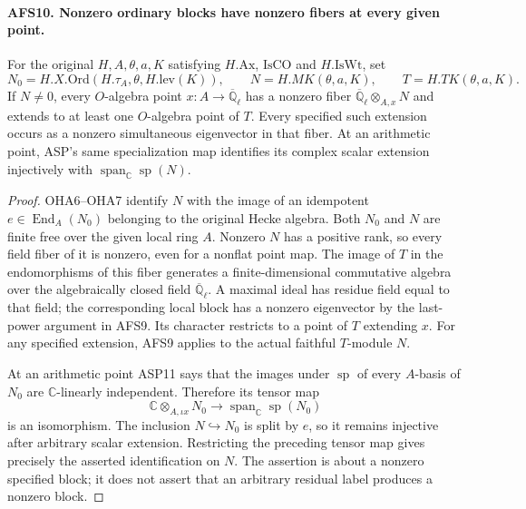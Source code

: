 \paragraph{AFS10. Nonzero ordinary blocks have nonzero fibers at every given point.}
\label{claim:AFS10}
For the original $H,A,\theta,a,K$ satisfying $H.\mathrm{Ax}$,
$\mathrm{IsCO}$ and $H.\mathrm{IsWt}$, set
\[
 N_0=H.X.\mathrm{Ord}(H.\tau_A,\theta,H.\mathrm{lev}(K)),
 \qquad N=H.MK(\theta,a,K),\qquad T=H.TK(\theta,a,K).
\]
If $N\ne0$, every $O$-algebra point $x:A\to
\overline{\mathbb Q}_\ell$ has a nonzero fiber
$\overline{\mathbb Q}_\ell\otimes_{A,x}N$ and extends to at
least one $O$-algebra point of $T$.  Every specified such
extension occurs as a nonzero simultaneous eigenvector in
that fiber.  At an arithmetic point, ASP's same specialization
map identifies its complex scalar extension injectively with
$\operatorname{span}_{\mathbb C}\operatorname{sp}(N)$.
\begin{proof}
OHA6--OHA7 identify $N$ with the image of an idempotent
$e\in\operatorname{End}_A(N_0)$ belonging to the original
Hecke algebra.  Both $N_0$ and $N$ are finite free over the
given local ring $A$.  Nonzero $N$ has a positive rank, so
every field fiber of it is nonzero, even for a nonflat point
map.  The image of $T$ in the endomorphisms of this fiber
generates a finite-dimensional commutative algebra over the
algebraically closed field $\overline{\mathbb Q}_\ell$.
A maximal ideal has residue field equal to that field;
the corresponding local block has a nonzero eigenvector
by the last-power argument in AFS9.  Its character restricts
to a point of $T$ extending $x$.  For any specified extension,
AFS9 applies to the actual faithful $T$-module $N$.

At an arithmetic point ASP11 says that the images under
$\operatorname{sp}$ of every $A$-basis of $N_0$ are
$\mathbb C$-linearly independent.  Therefore its tensor map
\[
 \mathbb C\otimes_{A,\iota x}N_0
     \longrightarrow\operatorname{span}_{\mathbb C}
                                      \operatorname{sp}(N_0)
\]
is an isomorphism.  The inclusion $N\hookrightarrow N_0$
is split by $e$, so it remains injective after arbitrary
scalar extension.  Restricting the preceding tensor map
gives precisely the asserted identification on $N$.
The assertion is about a nonzero specified block; it does
not assert that an arbitrary residual label produces a
nonzero block.
\end{proof}

